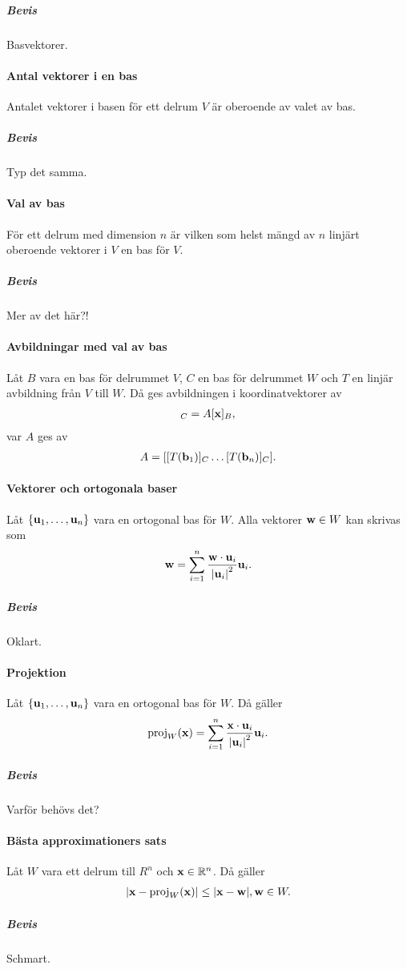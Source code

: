 \subparagraph{Bevis}
Basvektorer.

\paragraph{Antal vektorer i en bas}
Antalet vektorer i basen för ett delrum $V$ är oberoende av valet av bas.

\subparagraph{Bevis}
Typ det samma.

\paragraph{Val av bas}
För ett delrum med dimension $n$ är vilken som helst mängd av $n$ linjärt oberoende vektorer i $V$ en bas för $V$.

\subparagraph{Bevis}
Mer av det här?!

\paragraph{Avbildningar med val av bas}
Låt $B$ vara en bas för delrummet $V$, $C$ en bas för delrummet $W$ och $T$ en linjär avbildning från $V$ till $W$. Då ges avbildningen i koordinatvektorer av
\begin{align*}
	[T(\vect{x}]_C = A[\vect{x}]_B,
\end{align*}
var $A$ ges av
\begin{align*}
	A = [[T(\vect{b}_1)]_C \dots [T(\vect{b}_n)]_C].
\end{align*}

\paragraph{Vektorer och ortogonala baser}
Låt $\{\vect{u}_1, \dots, \vect{u}_n\}$ vara en ortogonal bas för $W$. Alla vektorer $\vect{w}\in W$ kan skrivas som
\begin{align*}
	\vect{w} = \sum\limits_{i = 1}^n \frac{\vect{w}\cdot\vect{u}_i}{\abs{\vect{u}_i}^2}\vect{u}_i.
\end{align*}

\subparagraph{Bevis}
Oklart.

\paragraph{Projektion}
Låt $\{\vect{u}_1, \dots, \vect{u}_n\}$ vara en ortogonal bas för $W$. Då gäller
\begin{align*}
	\proj{W}{\vect{x}} = \sum\limits_{i = 1}^n \frac{\vect{x}\cdot\vect{u}_i}{\abs{\vect{u}_i}^2}\vect{u}_i.
\end{align*}

\subparagraph{Bevis}
Varför behövs det?

\paragraph{Bästa approximationers sats}
Låt $W$ vara ett delrum till $R^n$ och $\vect{x}\in\R^n$. Då gäller
\begin{align*}
	\abs{\vect{x} - \proj{W}{\vect{x}}} \leq \abs{\vect{x} - \vect{w}}, \vect{w}\in W.
\end{align*}

\subparagraph{Bevis}
Schmart.